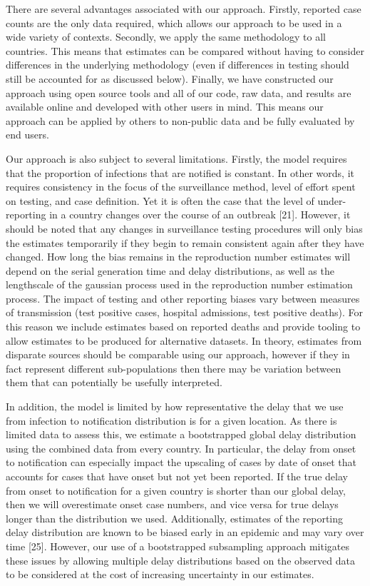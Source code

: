 \documentclass[
]{article}
\begin{document}
There are several advantages associated with our approach. Firstly,
reported case counts are the only data required, which allows our
approach to be used in a wide variety of contexts. Secondly, we apply
the same methodology to all countries. This means that estimates can be
compared without having to consider differences in the underlying
methodology (even if differences in testing should still be accounted
for as discussed below). Finally, we have constructed our approach using
open source tools and all of our code, raw data, and results are
available online and developed with other users in mind. This means our
approach can be applied by others to non-public data and be fully
evaluated by end users.

Our approach is also subject to several limitations. Firstly, the model
requires that the proportion of infections that are notified is
constant. In other words, it requires consistency in the focus of the
surveillance method, level of effort spent on testing, and case
definition. Yet it is often the case that the level of under-reporting
in a country changes over the course of an outbreak {[}21{]}. However,
it should be noted that any changes in surveillance testing procedures
will only bias the estimates temporarily if they begin to remain
consistent again after they have changed. How long the bias remains in
the reproduction number estimates will depend on the serial generation
time and delay distributions, as well as the lengthscale of the gaussian
process used in the reproduction number estimation process. The impact
of testing and other reporting biases vary between measures of
transmission (test positive cases, hospital admissions, test positive
deaths). For this reason we include estimates based on reported deaths
and provide tooling to allow estimates to be produced for alternative
datasets. In theory, estimates from disparate sources should be
comparable using our approach, however if they in fact represent
different sub-populations then there may be variation between them that
can potentially be usefully interpreted.

In addition, the model is limited by how representative the delay that
we use from infection to notification distribution is for a given
location. As there is limited data to assess this, we estimate a
bootstrapped global delay distribution using the combined data from
every country. In particular, the delay from onset to notification can
especially impact the upscaling of cases by date of onset that accounts
for cases that have onset but not yet been reported. If the true delay
from onset to notification for a given country is shorter than our
global delay, then we will overestimate onset case numbers, and vice
versa for true delays longer than the distribution we used.
Additionally, estimates of the reporting delay distribution are known to
be biased early in an epidemic and may vary over time {[}25{]}. However,
our use of a bootstrapped subsampling approach mitigates these issues by
allowing multiple delay distributions based on the observed data to be
considered at the cost of increasing uncertainty in our estimates.
\end{document}
